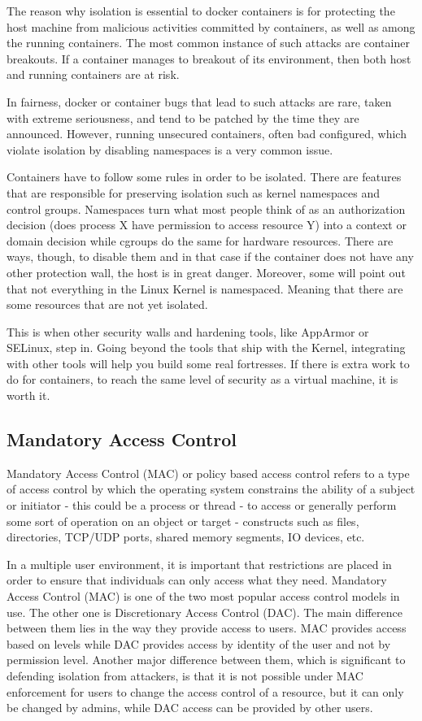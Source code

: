 The reason why isolation is essential to docker containers is for protecting the host machine from malicious activities committed by containers, as well as among the running containers. The most common instance of such attacks are container breakouts. If a container manages to breakout of its environment, then both host and running containers are at risk. 

In fairness, docker or container bugs that lead to such attacks are rare, taken with extreme seriousness, and tend to be patched by the time they are announced. However, running unsecured containers, often bad configured, which violate isolation by disabling namespaces is a very common issue.

Containers have to follow some rules in order to be isolated. There are features that are responsible for preserving isolation such as kernel namespaces and control groups. Namespaces turn what most people think of as an authorization decision (does process X have permission to access resource Y) into a context or domain decision while cgroups do the same for hardware resources. There are ways, though, to disable them and in that case if the container does not have any other protection wall, the host is in great danger. Moreover, some will point out that not everything in the Linux Kernel is namespaced. Meaning that there are some resources that are not yet isolated.

This is when other security walls and hardening tools, like AppArmor or SELinux, step in. Going beyond the tools that ship with the Kernel, integrating with other tools will help you build some real fortresses. If there is extra work to do for containers, to reach the same level of security as a virtual machine, it is worth it. \cite{isolatiocont}

\subsection{Mandatory Access Control}
Mandatory Access Control (MAC) or policy based access control refers to a type of access control by which the operating system constrains the ability of a subject or initiator - this could be a process or thread - to access or generally perform some sort of operation on an object or target - constructs such as files, directories, TCP/UDP ports, shared memory segments, IO devices, etc. \cite{wikimac}

In a multiple user environment, it is important that restrictions are placed in order to ensure that individuals can only access what they need. Mandatory Access Control (MAC) is one of the two most popular access control models in use. The other one is Discretionary Access Control (DAC). The main difference between them lies in the way they provide access to users. MAC provides access based on levels while DAC provides access by identity of the user and not by permission level. Another major difference between them, which is significant to defending isolation from attackers, is that it is not possible under MAC enforcement for users to change the access control of a resource, but it can only be changed by admins, while DAC access can be provided by other users.\cite{dacmac}

